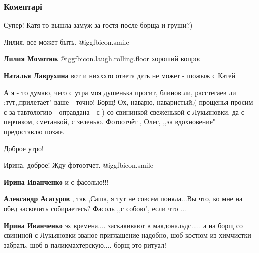  
 
 
 
 
\subsubsection{Коментарі}
\label{sec:05_11_2021.fb.fb_group.story_kiev_ua.1.rasskaz_borsch.cmt}

\begin{itemize} %
Супер! Катя то вышла замуж за гостя после борща и груши?)

\begin{itemize} %
Лилия, все может быть.  @igg{fbicon.smile} 

\textbf{Лилия Момотюк}  @igg{fbicon.laugh.rolling.floor} хороший вопрос

\textbf{Наталья Лаврухина} вот и нихххто ответа дать не может - шожыж с Катей
\end{itemize} %


А я - то думаю, чего с утра моя душенька просит, блинов ли, расстегаев ли
;тут,,прилетает" ваше - точно! Борщ! Ох, наварю, наваристый,( прощенья просим-
с за тавтологию - оправдана - с ) со свининкой свеженькой с Лукьяновки, да с
перчиком, сметанкой, с зеленью. Фотоотчёт , Олег, ,,за вдохновение" предоставлю
позже.

Доброе утро!

\begin{itemize} %
Ирина, доброе! Жду фотоотчет.  @igg{fbicon.smile} 

\textbf{Ирина Иванченко} и с фасолью!!!

\begin{itemize} %
\textbf{Александр Асатуров} , так ,Саша, я тут не совсем поняла...Вы что, ко мне на обед заскочить собираетесь? Фасоль ,,с собою", если что ...

\textbf{Ирина Иванченко} эх времена.... заскакивают в макдональдс..... а на борщ со свининой с Лукьяновки званое приглашение надобно, шоб костюм из химчистки забрать, шоб в паликмахтерскую.... борщ это ритуал!


\end{itemize}
\end{itemize}
\end{itemize}

